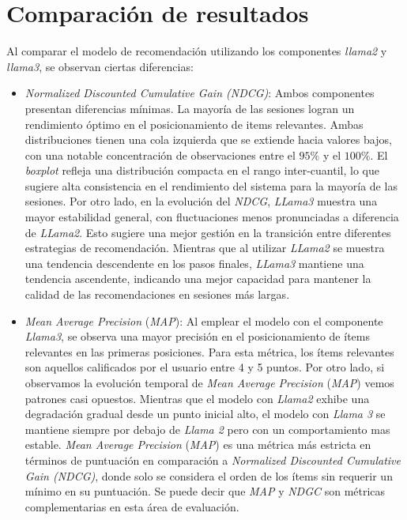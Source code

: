 \documentclass[11pt,a4paper,twoside]{thesis}
\begin{document}
\section{Comparación de resultados}

Al comparar el modelo de recomendación utilizando los componentes \textit{llama2} y \textit{llama3}, se observan ciertas diferencias:

\begin{itemize}
	\item \textit{Normalized Discounted Cumulative Gain (NDCG)}: Ambos componentes presentan diferencias mínimas. La mayoría de las sesiones logran un rendimiento óptimo en el posicionamiento de items relevantes. Ambas distribuciones tienen una cola izquierda que se extiende hacia valores bajos, con una notable concentración de observaciones entre el $95\%$ y el $100\%$. El \textit{boxplot} refleja una distribución compacta en el rango inter-cuantil, lo que sugiere alta consistencia en el rendimiento del sistema para la mayoría de las sesiones. Por otro lado, en la evolución del \textit{NDCG}, \textit{LLama3} muestra una mayor estabilidad general, con fluctuaciones menos pronunciadas a diferencia de \textit{LLama2}. Esto sugiere una mejor gestión en la transición entre diferentes estrategias de recomendación. Mientras que al utilizar \textit{LLama2} se muestra una tendencia descendente en los pasos finales, \textit{LLama3} mantiene una tendencia ascendente, indicando una mejor capacidad para mantener la calidad de las recomendaciones en sesiones más largas.

	\item \textit{Mean Average Precision} (\textit{MAP}): Al emplear el modelo con el componente \textit{Llama3}, se observa una mayor precisión en el posicionamiento de ítems relevantes en las primeras posiciones. Para esta métrica, los ítems relevantes son aquellos calificados por el usuario entre 4 y 5 puntos.
	      Por otro lado, si observamos la evolución temporal de \textit{Mean Average Precision} (\textit{MAP}) vemos patrones casi opuestos. Mientras que el modelo con \textit{Llama2} exhibe una degradación gradual desde un punto inicial alto, el modelo con \textit{Llama 3} se mantiene siempre por debajo de \textit{Llama 2} pero con un comportamiento mas estable. \textit{Mean Average Precision} (\textit{MAP}) es una métrica más estricta en términos de puntuación en comparación a \textit{Normalized Discounted Cumulative Gain (NDCG)}, donde solo se considera el orden de los ítems sin requerir un mínimo en su puntuación. Se puede decir que \textit{MAP} y \textit{NDGC} son métricas complementarias en esta área de evaluación.


\end{itemize}
\end{document}
